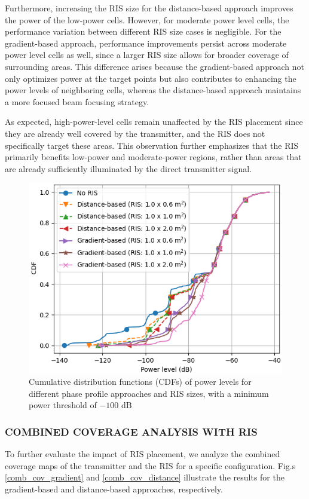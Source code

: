 \documentclass{IEEEoj}
\begin{document}
Furthermore, increasing the RIS size for the distance-based approach improves the power of the low-power cells. However, for moderate power level cells, the performance variation between different RIS size cases is negligible. For the gradient-based approach, performance improvements persist across moderate power level cells as well, since a larger RIS size allows for broader coverage of surrounding areas. This difference arises because the gradient-based approach not only optimizes power at the target points but also contributes to enhancing the power levels of neighboring cells, whereas the distance-based approach maintains a more focused beam focusing strategy.

As expected, high-power-level cells remain unaffected by the RIS placement since they are already well covered by the transmitter, and the RIS does not specifically target these areas. This observation further emphasizes that the RIS primarily benefits low-power and moderate-power regions, rather than areas that are already sufficiently illuminated by the direct transmitter signal.

\begin{figure}
	\centering \includegraphics[width=\linewidth]{Sim_Results/CDF_-100dB.png}
	\caption{Cumulative distribution functions (CDFs) of power levels for different phase profile approaches and RIS sizes, with a minimum power threshold of $-100$ dB}
	\label{CDF_-100dB}
\end{figure}

\subsubsection{COMBINED COVERAGE ANALYSIS WITH RIS}
To further evaluate the impact of RIS placement, we analyze the combined coverage maps of the transmitter and the RIS for a specific configuration. Fig.s \ref{comb_cov_gradient} and \ref{comb_cov_distance} illustrate the results for the gradient-based and distance-based approaches, respectively.
\end{document}

